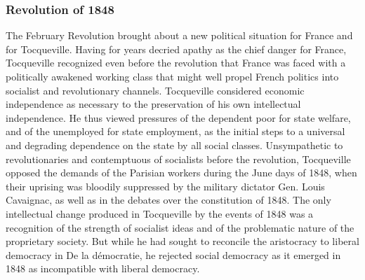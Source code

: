 \documentclass[12pt]{article}
\begin{document}
\subsubsection{Revolution of 1848}
The February Revolution brought about a new political situation for
                                      France and for Tocqueville. Having for years decried apathy as the
                                      chief danger for France, Tocqueville recognized even before the
                                      revolution that France was faced with a politically awakened working
                                      class that might well propel French politics into socialist and
                                      revolutionary channels. Tocqueville considered economic independence
                                      as necessary to the preservation of his own intellectual independence.
                                      He thus viewed pressures of the dependent poor for state welfare, and
                                      of the unemployed for state employment, as the initial steps to a
                                      universal and degrading dependence on the state by all social classes.
                                      Unsympathetic to revolutionaries and contemptuous of socialists
                                      before the revolution, Tocqueville opposed the demands of the
                                      Parisian workers during the June days of 1848, when their uprising
                                      was bloodily suppressed by the military dictator Gen. Louis
                                      Cavaignac, as well as in the debates over the constitution of 1848.
                                      The only intellectual change produced in Tocqueville by the events of
                                      1848 was a recognition of the strength of socialist ideas and of the
                                      problematic nature of the proprietary society. But while he had sought
                                      to reconcile the aristocracy to liberal democracy in De la
                                      d\'{e}mocratie, he rejected social democracy as it emerged in 1848 as
                                      incompatible with liberal democracy. 
\end{document}
